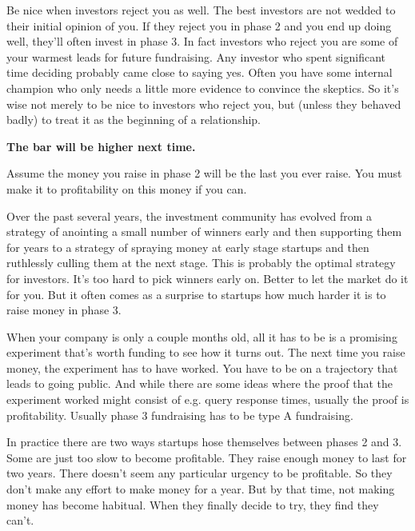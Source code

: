 Be nice when investors reject you as well. The
                    best investors are not wedded to their initial opinion of
                    you. If they reject you in phase 2 and you end up doing
                    well, they'll often invest in phase 3. In fact investors who
                    reject you are some of your warmest leads for future
                    fundraising. Any investor who spent significant time
                    deciding probably came close to saying yes. Often you have
                    some internal champion who only needs a little more evidence
                    to convince the skeptics. So it's wise not merely to be nice
                    to investors who reject you, but (unless they behaved badly)
                    to treat it as the beginning of a relationship.


                    \textbf{The bar will be higher next time.}

Assume
                    the money you raise in phase 2 will be the last you ever
                    raise. You must make it to profitability on this money if
                    you can.

Over the past several years, the
                    investment community has evolved from a strategy of
                    anointing a small number of winners early and then
                    supporting them for years to a strategy of spraying money at
                    early stage startups and then ruthlessly culling them at the
                    next stage. This is probably the optimal strategy for
                    investors. It's too hard to pick winners early on. Better to
                    let the market do it for you. But it often comes as a
                    surprise to startups how much harder it is to raise money in
                    phase 3.

When your company is only a couple
                    months old, all it has to be is a promising experiment
                    that's worth funding to see how it turns out. The next time
                    you raise money, the experiment has to have worked. You have
                    to be on a trajectory that leads to going public. And while
                    there are some ideas where the proof that the experiment
                    worked might consist of e.g. query response times, usually
                    the proof is profitability. Usually phase 3 fundraising has
                    to be type A fundraising.

In practice there are
                    two ways startups hose themselves between phases 2 and 3.
                    Some are just too slow to become profitable. They raise
                    enough money to last for two years. There doesn't seem any
                    particular urgency to be profitable. So they don't make any
                    effort to make money for a year. But by that time, not
                    making money has become habitual. When they finally decide
                    to try, they find they can't.

